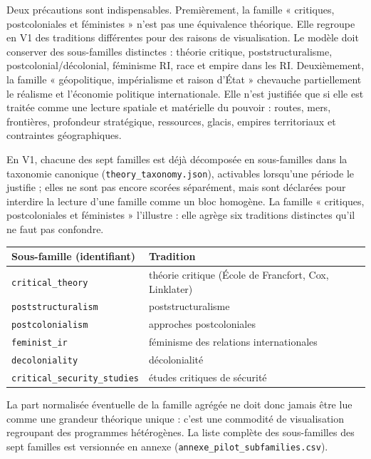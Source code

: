 \documentclass[11pt,a4paper]{article}
\begin{document}
Deux précautions sont indispensables. Premièrement, la famille « critiques, postcoloniales et féministes » n'est pas une équivalence théorique. Elle regroupe en V1 des traditions différentes pour des raisons de visualisation. Le modèle doit conserver des sous-familles distinctes : théorie critique, poststructuralisme, postcolonial/décolonial, féminisme RI, race et empire dans les RI. Deuxièmement, la famille « géopolitique, impérialisme et raison d'État » chevauche partiellement le réalisme et l'économie politique internationale. Elle n'est justifiée que si elle est traitée comme une lecture spatiale et matérielle du pouvoir : routes, mers, frontières, profondeur stratégique, ressources, glacis, empires territoriaux et contraintes géographiques.

En V1, chacune des sept familles est déjà décomposée en sous-familles dans la taxonomie canonique (\texttt{theory\_taxonomy.json}), activables lorsqu'une période le justifie ; elles ne sont pas encore scorées séparément, mais sont déclarées pour interdire la lecture d'une famille comme un bloc homogène. La famille « critiques, postcoloniales et féministes » l'illustre : elle agrège six traditions distinctes qu'il ne faut pas confondre.

\begin{center}
\begin{tabular}{p{5.2cm}p{8.5cm}}
\hline
Sous-famille (identifiant) & Tradition \\
\hline
\texttt{critical\_theory} & théorie critique (École de Francfort, Cox, Linklater) \\
\texttt{poststructuralism} & poststructuralisme \\
\texttt{postcolonialism} & approches postcoloniales \\
\texttt{feminist\_ir} & féminisme des relations internationales \\
\texttt{decoloniality} & décolonialité \\
\texttt{critical\_security\_studies} & études critiques de sécurité \\
\hline
\end{tabular}
\end{center}

La part normalisée éventuelle de la famille agrégée ne doit donc jamais être lue comme une grandeur théorique unique : c'est une commodité de visualisation regroupant des programmes hétérogènes. La liste complète des sous-familles des sept familles est versionnée en annexe (\texttt{annexe\_pilot\_subfamilies.csv}).
\end{document}

